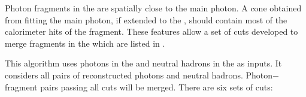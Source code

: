 Photon fragments in the \HCAL are  spatially close to the main photon. A cone obtained from fitting the main photon, if extended to the \HCAL, should contain most of the calorimeter hits of the fragment. These features allow a set of cuts developed to merge  fragments in the \HCAL which are listed in .


This algorithm uses photons in the \ECAL and neutral hadrons in the \HCAL as inputs. It considers all pairs of reconstructed photons and neutral hadrons. Photon$-$fragment pairs passing all cuts will be merged. There are six sets of cuts:


